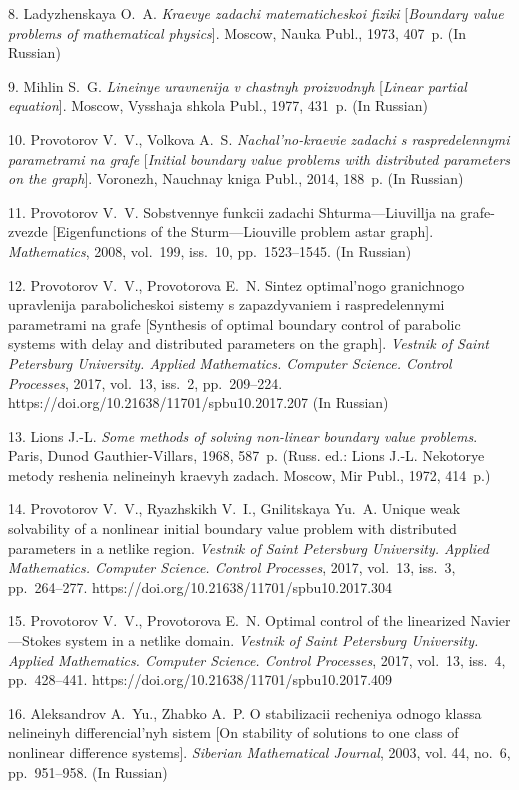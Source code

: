 {8. Ladyzhenskaya O.~A. \textit{Kraevye zadachi matematicheskoi
fiziki} [\textit{Boundary value problems of mathematical
physics}]. Moscow, Nauka Publ., 1973, 407~p. (In Russian)

9. Mihlin S.~G. \emph{Lineinye uravnenija v chastnyh proizvodnyh}
[\emph{Linear partial equation}]. Moscow, Vysshaja shkola Publ.,
1977, 431~p.  (In Russian)

10. Provotorov V.~V., Volkova A.~S.  \textit{Nachal'no-kraevie
zadachi s raspredelennymi parametrami na grafe} [\textit{Initial
boundary value problems with distributed parameters on the
graph}]. Voronezh, Nauchnay kniga Publ.,  2014,  188~p. (In
Russian)

11. Provotorov V.~V.  Sobstvennye funkcii zadachi
Shturma---Liuvillja na grafe-zvezde  [Eigenfunctions of the
Sturm---Liouville problem astar graph]. \emph{Mathematics}, 2008,
vol.~199, iss.~10, pp.~1523--1545.    (In Russian)

12. Provotorov V.~V., Provotorova E.~N. Sintez optimal'nogo
granichnogo upravlenija parabolicheskoi sistemy s zapazdyvaniem i
raspredelennymi parametrami na grafe [Synthesis of optimal
boundary control of parabolic systems with delay and distributed
parameters on the graph]. \emph{Vestnik of Saint Petersburg
University. Applied Mathematics. Computer Science. Control
Processes}, 2017, vol.~13, iss.~2, pp.~209--224.
https://doi.org/10.21638/11701/spbu10.2017.207 (In Russian)

13. Lions J.-L. \textit{Some methods of solving non-linear
boundary value problems}. Paris, Dunod  Gauthier-Villars, 1968,
587~p. (Russ. ed.: Lions J.-L. Nekotorye metody reshenia
nelineinyh kraevyh zadach. Moscow, Mir Publ., 1972, 414~p.)

14. Provotorov V.~V.,  Ryazhskikh V.~I., Gnilitskaya Yu.~A. Unique
weak solvability of a nonlinear initial boundary value problem
with distributed parameters in a netlike region. \emph{Vestnik of
Saint Petersburg University. Applied Mathematics. Computer
Science. Control Processes}, 2017, vol.~13, iss.~3, pp.~264--277.
https://doi.org/10.21638/11701/spbu10.2017.304

15. Provotorov V.~V., Provotorova E.~N.  Optimal control of the
linearized Navier---Stokes system in a netlike domain.
\emph{Vestnik of Saint Petersburg University. Applied Mathematics.
Computer Science. Control Processes}, 2017, vol.~13, iss.~4,
pp.~428--441. https://doi.org/10.21638/11701/spbu10.2017.409

16. Aleksandrov A.~Yu., Zhabko A.~P. O stabilizacii recheniya
odnogo klassa nelineinyh diffe\-ren\-cial'nyh sistem [On stability
of solutions to one class of nonlinear difference systems].
\emph{Siberian Mathematical Journal}, 2003, vol. 44, no.~6,
pp.~951--958. (In Russian)

}
